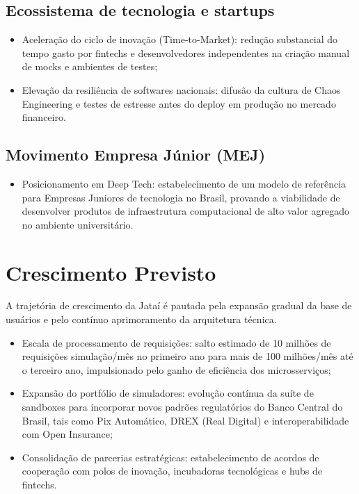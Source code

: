 \documentclass[
  12pt,
  openright,
  oneside,
  a4paper,
  brazilian
]{abntex2}
\begin{document}
\subsection{Ecossistema de tecnologia e startups}
\begin{itemize}
    \item{Aceleração do ciclo de inovação (Time-to-Market):} redução substancial do tempo gasto por fintechs e desenvolvedores independentes na criação manual de mocks e ambientes de testes;
    \item{Elevação da resiliência de softwares nacionais:} difusão da cultura de Chaos Engineering e testes de estresse antes do deploy em produção no mercado financeiro.
\end{itemize}

\subsection{Movimento Empresa Júnior (MEJ)}
\begin{itemize}
    \item{Posicionamento em Deep Tech:} estabelecimento de um modelo de referência para Empresas Juniores de tecnologia no Brasil, provando a viabilidade de desenvolver produtos de infraestrutura computacional de alto valor agregado no ambiente universitário.
\end{itemize}

\section{Crescimento Previsto}
\label{sec:crescimento_previsto}

A trajetória de crescimento da Jataí é pautada pela expansão gradual da base de usuários e pelo contínuo aprimoramento da arquitetura técnica.

\begin{itemize}
    \item{Escala de processamento de requisições:} salto estimado de 10 milhões de requisições simulação/mês no primeiro ano para mais de 100 milhões/mês até o terceiro ano, impulsionado pelo ganho de eficiência dos microsserviços;
    \item{Expansão do portfólio de simuladores:} evolução contínua da suíte de sandboxes para incorporar novos padrões regulatórios do Banco Central do Brasil, tais como Pix Automático, DREX (Real Digital) e interoperabilidade com Open Insurance;
    \item{Consolidação de parcerias estratégicas:} estabelecimento de acordos de cooperação com polos de inovação, incubadoras tecnológicas e hubs de fintechs.
\end{itemize}
\end{document}
